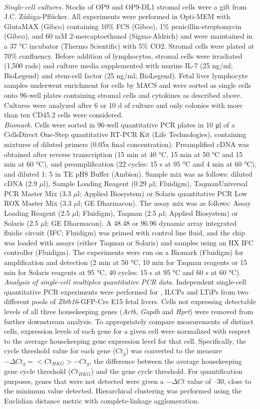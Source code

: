 \\
\textit{Single-cell cultures.}
Stocks of OP9 and OP9-DL1 stromal cells were a gift from J.C. Zúñiga-Pflücker. All experiments were performed in Opti-MEM with GlutaMAX (Gibco) containing 10\% FCS (Gibco), 1\% penicillin-streptomycin (Gibco), and 60 mM 2-mercaptoethanol (Sigma-Aldrich) and were maintained in a 37 °C incubator (Thermo Scientific) with 5\% CO2. Stromal cells were plated at 70\% confluency. Before addition of lymphocytes, stromal cells were irradiated (1,500 rads) and culture media supplemented with murine IL-7 (25 ng/ml; BioLegend) and stem-cell factor (25 ng/ml; BioLegend). Fetal liver lymphocyte samples underwent enrichment for \ab\UP{} cells by MACS and were sorted as single cells onto 96-well plates containing stromal cells and cytokines as described above. Cultures were analyzed after 6 or 10 d of culture and only colonies with more than ten CD45.2\UP{} cells were considered.
\\
\textit{Biomark.}
Cells were sorted in 96-well quantitative PCR plates in 10 μl of a CellsDirect One-Step quantitative RT-PCR Kit (Life Technologies), containing mixtures of diluted primers (0.05x final concentration). Preamplified cDNA was obtained after reverse transcription (15 min at 40 °C, 15 min at 50 °C and 15 min at 60 °C), and preamplification (22 cycles: 15 s at 95 °C and 4 min at 60 °C), and diluted 1: 5 in TE pH8 Buffer (Ambion). Sample mix was as follows: diluted cDNA (2.9 $\mu$l), Sample Loading Reagent (0.29 $\mu$l; Fluidigm), TaqmanUniversal PCR Master Mix (3.3 $\mu$l; Applied Biosystem) or Solaris quantitative PCR Low ROX Master Mix (3.3 $\mu$l; GE Dharmacon). The assay mix was as follows: Assay Loading Reagent (2.5 $\mu$l; Fluidigm), Taqman (2.5 $\mu$l; Applied Biosystem) or Solaris (2.5 $\mu$l; GE Dharmacon). A 48.48 or 96.96 dynamic array integrated fluidic circuit (IFC; Fluidigm) was primed with control line fluid, and the chip was loaded with assays (either Taqman or Solaris) and samples using an HX IFC controller (Fluidigm). The experiments were run on a Biomark (Fluidigm) for amplification and detection (2 min at 50 °C, 10 min for Taqman reagents or 15 min for Solaris reagents at 95 °C, 40 cycles: 15 s at 95 °C and 60 s at 60 °C).
\\
\textit{Analysis of single-cell multiplex quantitative PCR data.} Independent single-cell quantitative PCR experiments were performed for \aLPs, ILCPs and LTiPs from two different pools of \textit{Zbtb16}-GFP-Cre E15 fetal livers. Cells not expressing detectable levels of all three housekeeping genes (\textit{Actb}, \textit{Gapdh} and \textit{Hprt}) were removed from further downstream analysis. To appropriately compare measurements of distinct cells, expression levels of each gene for a given cell were normalized with respect to the average housekeeping gene expression level for that cell. Specifically, the cycle threshold value for each gene ($Ct_g$) was converted to the measure $-\Delta Ct_g = < Ct_{HKG} > −Ct_g$, the difference between the average housekeeping gene cycle threshold ($Ct_{HKG}$) and the gene cycle threshold. For quantification purposes, genes that were not detected were given a $-\Delta Ct$ value of --30, close to the minimum value detected. Hierarchical clustering was performed using the Euclidian distance metric with complete-linkage agglomeration.
